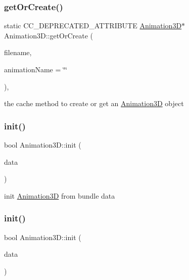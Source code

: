 \subsubsection{\texorpdfstring{get\+Or\+Create()}{getOrCreate()}\hspace{0.1cm}{\footnotesize\ttfamily [2/2]}}
{\footnotesize\ttfamily static C\+C\+\_\+\+D\+E\+P\+R\+E\+C\+A\+T\+E\+D\+\_\+\+A\+T\+T\+R\+I\+B\+U\+TE \hyperlink{classAnimation3D}{Animation3D}$\ast$ Animation3\+D\+::get\+Or\+Create (\begin{DoxyParamCaption}\item[{const std\+::string \&}]{filename,  }\item[{const std\+::string \&}]{animation\+Name = {\ttfamily \char`\"{}\char`\"{}} }\end{DoxyParamCaption})\hspace{0.3cm}{\ttfamily [inline]}, {\ttfamily [static]}}

the cache method to create or get an \hyperlink{classAnimation3D}{Animation3D} object \mbox{\label{classAnimation3D_af7c9c6855dd22f46b4e774f12b243f18}} 
\subsubsection{\texorpdfstring{init()}{init()}\hspace{0.1cm}{\footnotesize\ttfamily [1/2]}}
{\footnotesize\ttfamily bool Animation3\+D\+::init (\begin{DoxyParamCaption}\item[{const \hyperlink{structAnimation3DData}{Animation3\+D\+Data} \&}]{data }\end{DoxyParamCaption})}

init \hyperlink{classAnimation3D}{Animation3D} from bundle data \mbox{\label{classAnimation3D_af7c9c6855dd22f46b4e774f12b243f18}} 
\subsubsection{\texorpdfstring{init()}{init()}\hspace{0.1cm}{\footnotesize\ttfamily [2/2]}}
{\footnotesize\ttfamily bool Animation3\+D\+::init (\begin{DoxyParamCaption}\item[{const \hyperlink{structAnimation3DData}{Animation3\+D\+Data} \&}]{data }\end{DoxyParamCaption})}

